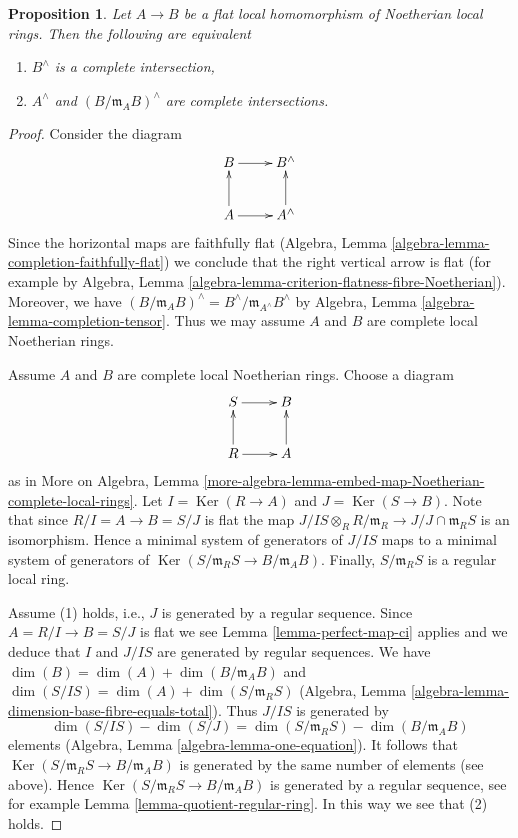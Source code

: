 \documentclass{stacks-project}
\theoremstyle{plain}
\newtheorem{proposition}[subsection]{Proposition}
\theoremstyle{definition}
\theoremstyle{remark}
\numberwithin{equation}{subsection}
\def\Ker{\mathop{\mathrm{Ker}}}
\begin{document}
\begin{proposition}
\label{proposition-avramov}
Let $A \to B$ be a flat local homomorphism of Noetherian local rings.
Then the following are equivalent
\begin{enumerate}
\item $B^\wedge$ is a complete intersection,
\item $A^\wedge$ and $(B/\mathfrak m_A B)^\wedge$ are complete intersections.
\end{enumerate}
\end{proposition}

\begin{proof}
Consider the diagram
$$
\xymatrix{
B \ar[r] & B^\wedge \\
A \ar[u] \ar[r] & A^\wedge \ar[u]
}
$$
Since the horizontal maps are faithfully flat
(Algebra, Lemma \ref{algebra-lemma-completion-faithfully-flat})
we conclude that the right vertical arrow is flat
(for example by Algebra, Lemma
\ref{algebra-lemma-criterion-flatness-fibre-Noetherian}).
Moreover, we have
$(B/\mathfrak m_A B)^\wedge = B^\wedge/\mathfrak m_{A^\wedge} B^\wedge$
by Algebra, Lemma \ref{algebra-lemma-completion-tensor}.
Thus we may assume $A$ and $B$ are complete local Noetherian rings.

\medskip\noindent
Assume $A$ and $B$ are complete local Noetherian rings.
Choose a diagram
$$
\xymatrix{
S \ar[r] & B \\
R \ar[u] \ar[r] & A \ar[u]
}
$$
as in More on Algebra, Lemma
\ref{more-algebra-lemma-embed-map-Noetherian-complete-local-rings}.
Let $I = \Ker(R \to A)$ and $J = \Ker(S \to B)$.
Note that since $R/I = A \to B = S/J$ is flat the map
$J/IS \otimes_R R/\mathfrak m_R \to J/J \cap \mathfrak m_R S$
is an isomorphism. Hence a minimal system of generators of $J/IS$
maps to a minimal system of generators of
$\Ker(S/\mathfrak m_R S \to B/\mathfrak m_A B)$.
Finally, $S/\mathfrak m_R S$ is a regular local ring.

\medskip\noindent
Assume (1) holds, i.e., $J$ is generated by a regular sequence.
Since $A = R/I \to B = S/J$ is flat we see
Lemma \ref{lemma-perfect-map-ci} applies and we deduce
that $I$ and $J/IS$ are generated by regular sequences.
We have $\dim(B) = \dim(A) + \dim(B/\mathfrak m_A B)$ and
$\dim(S/IS) = \dim(A) + \dim(S/\mathfrak m_R S)$
(Algebra, Lemma \ref{algebra-lemma-dimension-base-fibre-equals-total}).
Thus $J/IS$ is generated by
$$
\dim(S/IS) - \dim(S/J) = \dim(S/\mathfrak m_R S) - \dim(B/\mathfrak m_A B)
$$
elements (Algebra, Lemma \ref{algebra-lemma-one-equation}).
It follows that $\Ker(S/\mathfrak m_R S \to B/\mathfrak m_A B)$
is generated by the same number of elements (see above).
Hence $\Ker(S/\mathfrak m_R S \to B/\mathfrak m_A B)$
is generated by a regular sequence, see for example
Lemma \ref{lemma-quotient-regular-ring}.
In this way we see that (2) holds.


\end{proof}
\end{document}
